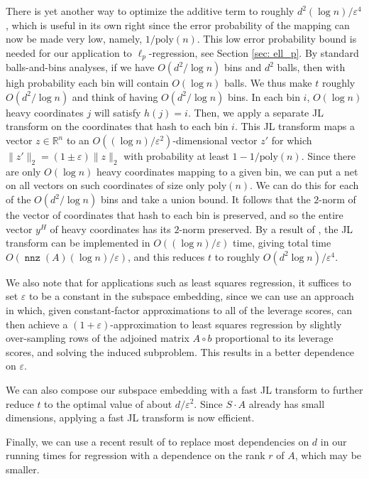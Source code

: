 \documentclass{sig-alternate}
\DeclareMathOperator{\nnz}{\mathtt{nnz}}
\newcommand{\poly}{{\mathrm{poly}}}
\newcommand{\eps}{\varepsilon}
\begin{document}
There is yet another way to optimize the additive term to roughly $d^2 (\log n)/\eps^4$, which is useful in its own
right since the error probability of the mapping can now be made very low, namely, $1/\poly(n)$. This low error
probability bound is needed for our application to $\ell_p$-regression, see Section \ref{sec: ell_p}.
By standard balls-and-bins analyses, if we have $O(d^2/\log n)$ bins and $d^2$ balls, then with 
high probability each bin will contain $O(\log n)$ balls. We thus make $t$ roughly $O(d^2/ \log n)$ and think
of having $O(d^2/\log n)$ bins. In each bin $i$, $O(\log n)$ heavy coordinates $j$ 
will satisfy $h(j) = i$.
Then, we apply a separate JL transform on the coordinates that hash to each bin $i$. 
This JL
transform maps a vector $z \in \mathbb{R}^n$ to an $O((\log n) / \eps^2)$-dimensional vector $z'$ for which
$\|z'\|_2 = (1 \pm \eps) \|z\|_2$ with probability at least $1-1/\poly(n)$. Since there are only $O(\log n)$
heavy coordinates mapping to a given bin, we can put a net on all vectors on such coordinates of size only 
$\poly(n)$. We can do this for each of the 
$O(d^2 / \log n)$ bins and take a union bound. It follows 
that the $2$-norm of the vector of coordinates that hash to each bin is preserved, and so the entire
vector $y^H$ of heavy coordinates has its $2$-norm preserved. By a result of \cite{KN12}, 
the JL
transform can be implemented in $O((\log n) / \eps)$ time, giving total time $O(\nnz(A) (\log n) / \eps)$, and
this reduces $t$ to roughly $O(d^2 \log n)/\eps^4$. 


We also note that for applications such as least squares regression, it suffices to set
$\eps$ to be a constant in the subspace embedding, since we can use an approach in \cite{dmm06,ddhkm09}
which, given constant-factor 
approximations to all of the
leverage scores, can then achieve a $(1+\eps)$-approximation to least squares regression by slightly 
over-sampling rows of the adjoined matrix $A \circ b$ proportional to its leverage scores,
and solving the induced subproblem. This results in a better dependence on $\eps$. 

We can also compose our subspace embedding with a fast JL transform
to further reduce $t$ to the optimal value of about $d/\eps^2$. Since $S \cdot A$ already has small
dimensions, applying a fast JL transform is now efficient. 

Finally, we can use a recent result of \cite{ckl12} to replace most dependencies on $d$ in 
our running times for regression with a dependence on the rank $r$ of $A$, which may be smaller. 
\end{document}

